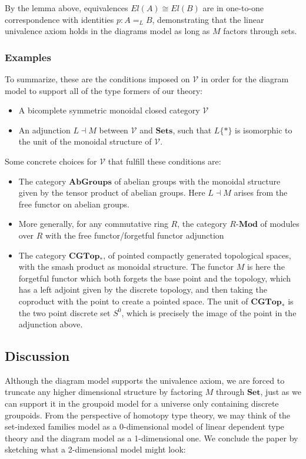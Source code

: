 \documentclass[a4paper,english]{lipics-v2018}
\begin{document}
  By the lemma above, equivalences $El(A) \cong El(B)$ are in one-to-one correspondence with identities $p : A =_L B$, demonstrating that the linear univalence axiom holds in the diagrams model as long as $M$ factors through sets.
  \subsubsection{Examples}
To summarize, these are the conditions imposed on $\mathcal{V}$ in order for the diagram model to support all of the type formers of our theory:
\begin{itemize}
\item A bicomplete symmetric monoidal closed category $\mathcal{V}$
\item An adjunction $L \dashv M$ between $\mathcal{V}$ and $\mathbf{Sets}$, such that $L\{*\}$ is isomorphic to the unit of the monoidal structure of $\mathcal{V}$.
\end{itemize}
Some concrete choices for $\mathcal{V}$ that fulfill these conditions are:
\begin{itemize}
\item The category $\mathbf{AbGroups}$ of abelian groups with the monoidal structure given by the tensor product of abelian groups. Here $L \dashv M$ arises from the free functor on abelian groups.
\item More generally, for any commutative ring $R$, the category $R$-$\mathbf{Mod}$ of modules over $R$ with the free functor/forgetful functor adjunction
\item The category $\mathbf{CGTop}_*$, of pointed compactly generated topological spaces, with the smash product as monoidal structure. The functor $M$ is here the forgetful functor which both forgets the base point and the topology, which has a left adjoint given by the discrete topology, and then taking the coproduct with the point to create a pointed space. The unit of $\mathbf{CGTop}_*$ is the two point discrete set $S^0$, which is precisely the image of the point in the adjunction above.
\end{itemize}
  \subsection{Discussion}
  Although the diagram model supports the univalence axiom, we are forced to truncate any higher dimensional structure by factoring $M$ through $\mathbf{Set}$, just as we can support it in the groupoid model for a universe only containing discrete groupoids. From the perspective of homotopy type theory, we may think of the set-indexed families model as a 0-dimensional model of linear dependent type theory and the diagram model as a 1-dimensional one. We conclude the paper by sketching what a 2-dimensional model might look:
\end{document}
